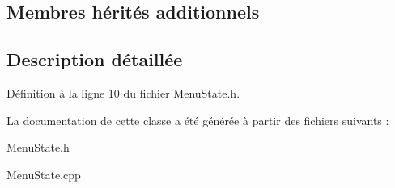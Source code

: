 \subsection*{Membres hérités additionnels}


\subsection{Description détaillée}


Définition à la ligne 10 du fichier Menu\+State.\+h.



La documentation de cette classe a été générée à partir des fichiers suivants \+:\begin{DoxyCompactItemize}
\item 
Menu\+State.\+h\item 
Menu\+State.\+cpp\end{DoxyCompactItemize}
